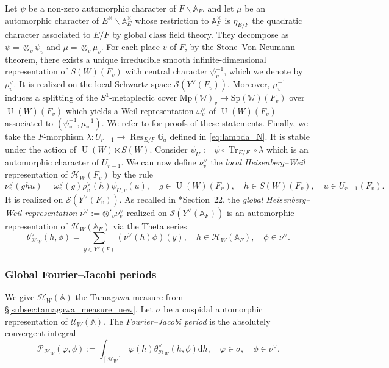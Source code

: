 \documentclass[letterpaper,11pt]{amsart}
\newcommand{\bA}{\mathbb{A}}
\newcommand{\bG}{\mathbb{G}}
\newcommand{\bW}{\mathbb{W}}
\newcommand{\cH}{\mathcal{H}}
\newcommand{\cS}{\mathcal{S}}
\newcommand{\cU}{\mathcal{U}}
\newcommand{\rd}{\mathrm{d}}
\newcommand{\<}{\negthickspace}
\DeclareMathOperator{\Tr}{Tr}
\DeclareMathOperator{\U}{U}
\DeclareMathOperator{\Res}{Res}
\theoremstyle{definition}
\theoremstyle{plain}
\theoremstyle{remark}
\numberwithin{equation}{section}
\begin{document}
Let $\psi$ be a non-zero automorphic character of $F \backslash \bA_F$, and let $\mu$ be an automorphic character of $E^\times \backslash \bA_E^\times$ whose restriction to $\bA_F^\times$ is $\eta_{E/F}$ the quadratic character associated to $E/F$ by global class field theory. They decompose as $\psi=\otimes_v \psi_v$ and $\mu=\otimes_v \mu_v$. For each place $v$ of $F$, by the Stone--Von-Neumann theorem, there exists a unique irreducible smooth infinite-dimensional representation of $S(W)(F_v)$ with central character $\psi_v^{-1}$, which we denote by $\rho_{v}^\vee$. It is realized on the local Schwartz space $\cS(Y^\vee(F_v))$. Moreover, $\mu^{-1}_v$ induces a splitting of the $S^1$-metaplectic cover $\mathrm{Mp}(\bW)_v \to \mathrm{Sp}(\bW)(F_v)$ over $\U(W)(F_v)$ which yields a Weil representation $\omega^\vee_{v}$ of $\U(W)(F_v)$ associated to $(\psi_v^{-1},\mu_v^{-1})$. We refer to \cite{MVW} for proofs of these statements. Finally, we take the $F$-morphism $\lambda : U_{r-1} \to \Res_{E/F} \bG_a$ defined in \eqref{eq:lambda_N}. It is stable under the action of $\U(W) \ltimes S(W)$. Consider $\psi_U:=\psi \circ \Tr_{E/F} \circ \lambda$ which is an automorphic character of $U_{r-1}$. We can now define $\nu_v^\vee$ the \emph{local Heisenberg--Weil} representation of $\cH_W(F_v)$ by the rule 
\begin{equation*}
    \nu_v^\vee(g h u)=\omega_v^\vee(g) \rho_v^\vee(h) \overline{\psi}_{U,v}(u), \quad g \in \U(W)(F_v), \quad h \in S(W)(F_v), \quad u \in U_{r-1}(F_v).
\end{equation*}
It is realized on $\cS(Y^\vee(F_v))$. As recalled in \cite{GGP}*{Section~22}, the \emph{global Heisenberg--Weil representation} $\nu^\vee:=\otimes'_v \nu_v^\vee$ realized on $\cS(Y^\vee(\bA_F))$ is an automorphic representation of $\cH_W(\bA_F)$ via the Theta series
\begin{equation*}
    \theta_{\cH_W}^\vee(h,\phi)=\sum_{y \in Y^\vee(F)} (\nu^\vee(h)\phi)(y), \quad h \in \cH_W(\bA_F), \quad \phi \in \nu^\vee.
\end{equation*}

\subsubsection{Global Fourier--Jacobi periods}


We give $\cH_W(\bA)$ the Tamagawa measure from \S\ref{subsec:tamagawa_measure_new}. Let $\sigma$ be a cuspidal automorphic representation of $\cU_W(\bA)$. The \emph{Fourier--Jacobi period} is the absolutely convergent integral
    \begin{equation}
        \label{eq:global_FJ_intro}
         \mathcal{P}_{\cH_W}(\varphi, \phi) :=
    \int_{[\cH_W]} \varphi(h) \theta^\vee_{\cH_W}(h,\phi) \rd h, \quad \varphi \in \sigma, \quad \phi \in \nu^\vee.
    \end{equation}
\end{document}
